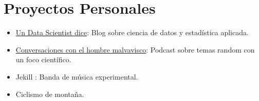 \documentclass[11pt, a4paper]{awesome-cv}
\begin{document}
\hypertarget{proyectos-personales}{%
\section{Proyectos Personales}\label{proyectos-personales}}

\begin{itemize}
\item
  \href{www.danieljimenezm.com}{Un Data Scientist dice}: Blog sobre ciencia de datos y estadística aplicada.
\item
  \href{https://anchor.fm/dashboard/episode/e9nh7m}{Conversaciones con el hombre malvavisco}: Podcast sobre temas random con un foco científico.
\item
  Jekill : Banda de música experimental.
\item
  Ciclismo de montaña.
\end{itemize}
\end{document}
